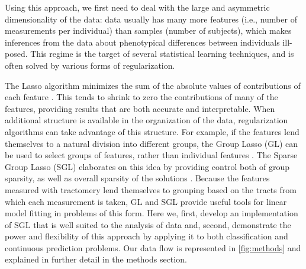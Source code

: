 \documentclass[10pt,letterpaper]{article}
\begin{document}

Using this approach, we first need to deal with the large and
asymmetric dimensionality of the data: 
data usually has
many more features (i.e., number of measurements per individual) than
samples (number of subjects), which makes inferences from the data
about phenotypical differences between individuals ill-posed. This
regime is the target of several statistical learning techniques, and
is often solved by various forms of regularization.

The Lasso algorithm minimizes the sum of the absolute values of
contributions of each feature \cite{Tibshirani1996-qs}. This
tends to shrink to zero the contributions of many of the features,
providing results that are both accurate and interpretable. When
additional structure is available in the organization of the data,
regularization algorithms can take advantage of this structure. For
example, if the features lend themselves to a natural division into
different groups, the Group Lasso (GL) can be used to select groups
of features, rather than individual features \cite{Yuan2006-ky}.
The Sparse Group Lasso (SGL) elaborates on this idea by providing
control both of group sparsity, as well as overall sparsity of the
solutions \cite{simon2013sgl}. Because the features measured with
tractomery lend themselves to grouping based on the tracts from which
each measurement is taken, GL and SGL provide useful tools
for linear model fitting in problems of this form. Here we, first,
develop an implementation of SGL that is well suited to the analysis of
 data and, second, demonstrate the power and flexibility of
this approach by applying it to both classification
and continuous prediction problems. Our  data flow is
represented in \cref{fig:methods} and explained in further detail in
the methods section.
\end{document}
